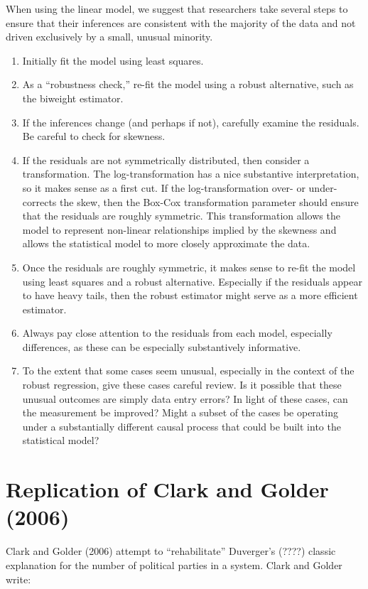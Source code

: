 \documentclass[12pt]{article}
\begin{document}
When using the linear model, we suggest that researchers take several steps to ensure that their inferences are consistent with the majority of the data and not driven exclusively by a small, unusual minority. 
\begin{enumerate}
	\item Initially fit the model using least squares. 
	\item As a ``robustness check,'' re-fit the model using a robust alternative, such as the biweight estimator. 
	\item If the inferences change (and perhaps if not), carefully examine the residuals. Be careful to check for skewness.
	\item If the residuals are not symmetrically distributed, then consider a transformation. The log-transformation has a nice substantive interpretation, so it makes sense as a first cut. If the log-transformation over- or under-corrects the skew, then the Box-Cox transformation parameter should ensure that the residuals are roughly symmetric. This transformation allows the model to represent non-linear relationships implied by the skewness and allows the statistical model to more closely approximate the data.
	\item Once the residuals are roughly symmetric, it makes sense to re-fit the model using least squares and a robust alternative. Especially if the residuals appear to have heavy tails, then the robust estimator might serve as a more efficient estimator.
	\item Always pay close attention to the residuals from each model, especially differences, as these can be especially substantively informative.
	\item To the extent that some cases seem unusual, especially in the context of the robust regression, give these cases careful review. Is it possible that these unusual outcomes are simply data entry errors? In light of these cases, can the measurement be improved? Might a subset of the cases be operating under a substantially different causal process that could be built into the statistical model? 
\end{enumerate}

\section*{Replication of Clark and Golder (2006)}

Clark and Golder (2006) attempt to ``rehabilitate'' Duverger's (????) classic explanation for the number of political parties in a system. Clark and Golder write: 
\end{document}
